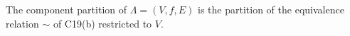 The component partition of $\Lambda = (V, f, E)$ is the partition of the equivalence relation $\sim$ of C19(b) restricted to $V$.
